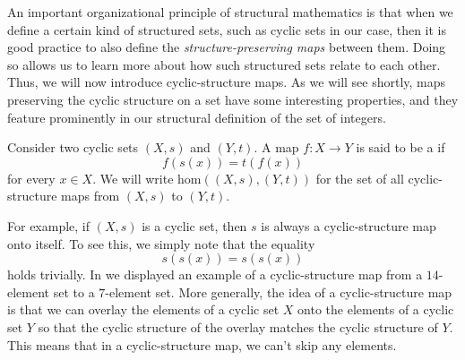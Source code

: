 An important organizational principle of structural mathematics is that when we define a certain kind of structured sets, such as cyclic sets in our case, then it is good practice to also define the \emph{structure-preserving maps} between them. Doing so allows us to learn more about how such structured sets relate to each other. Thus, we will now introduce cyclic-structure maps. As we will see shortly, maps preserving the cyclic structure on a set have some interesting properties, and they feature prominently in our structural definition of the set of integers.

\begin{definition}
  Consider two cyclic sets $(X,s)$ and $(Y,t)$. A map $f:X\to Y$ is said to be a  if
  \begin{equation*}
    f(s(x))=t(f(x))
  \end{equation*}
  for every $x\in X$. We will write $\mathrm{hom}((X,s),(Y,t))$ for the set of all cyclic-structure maps from $(X,s)$ to $(Y,t)$.
\end{definition}

For example, if $(X,s)$ is a cyclic set, then $s$ is always a cyclic-structure map onto itself. To see this, we simply note that the equality
\begin{equation*}
  s(s(x))=s(s(x))
\end{equation*}
holds trivially. In  we displayed an example of a cyclic-structure map from a $14$-element set to a $7$-element set. More generally, the idea of a cyclic-structure map is that we can overlay the elements of a cyclic set $X$ onto the elements of a cyclic set $Y$ so that the cyclic structure of the overlay matches the cyclic structure of $Y$. This means that in a cyclic-structure map, we can't skip any elements.

